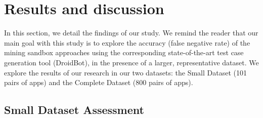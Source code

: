 \section{Results and discussion}\label{sec:results}



In this section, we detail the findings of our study.  We remind the reader that our main goal with this study is to explore the
accuracy (false negative rate) of the mining sandbox approaches using the corresponding state-of-the-art
test case generation tool (DroidBot), in the presence of a larger, representative dataset. We explore
the results of our research in our two datasets: the Small Dataset (101 pairs of apps) and the Complete Dataset (800 pairs of apps).



\subsection{Small Dataset Assessment}

